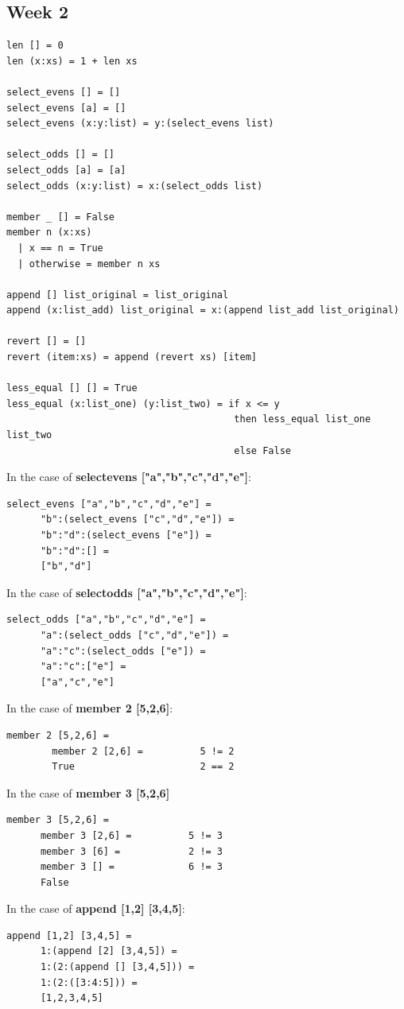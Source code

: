 \documentclass{article}
\theoremstyle{theorem}
\theoremstyle{definition}
\theoremstyle{remark}
\begin{document}
\subsection{Week 2}
\begin{lstlisting}
len [] = 0
len (x:xs) = 1 + len xs

select_evens [] = []
select_evens [a] = []
select_evens (x:y:list) = y:(select_evens list)

select_odds [] = []
select_odds [a] = [a]
select_odds (x:y:list) = x:(select_odds list)

member _ [] = False
member n (x:xs)
  | x == n = True
  | otherwise = member n xs

append [] list_original = list_original
append (x:list_add) list_original = x:(append list_add list_original)

revert [] = []
revert (item:xs) = append (revert xs) [item]

less_equal [] [] = True
less_equal (x:list_one) (y:list_two) = if x <= y
									    then less_equal list_one list_two
									    else False
\end{lstlisting}
In the case of \textbf{select\textunderscore evens ["a","b","c","d","e"]}:
\begin{lstlisting}
select_evens ["a","b","c","d","e"] =
      "b":(select_evens ["c","d","e"]) =
      "b":"d":(select_evens ["e"]) =
      "b":"d":[] =
      ["b","d"]
\end{lstlisting}
In the case of \textbf{select\textunderscore odds ["a","b","c","d","e"]}:
\begin{lstlisting}
select_odds ["a","b","c","d","e"] =
      "a":(select_odds ["c","d","e"]) =
      "a":"c":(select_odds ["e"]) =
      "a":"c":["e"] =
      ["a","c","e"]
\end{lstlisting}
In the case of \textbf{member 2 [5,2,6]}:
\begin{lstlisting}
member 2 [5,2,6] =
        member 2 [2,6] =          5 != 2
        True                      2 == 2
\end{lstlisting}
In the case of \textbf{member 3 [5,2,6]}
\begin{lstlisting}
member 3 [5,2,6] =
      member 3 [2,6] =          5 != 3
      member 3 [6] =            2 != 3
      member 3 [] =             6 != 3
      False
\end{lstlisting}
In the case of \textbf{append [1,2] [3,4,5]}:
\begin{lstlisting}
append [1,2] [3,4,5] =
      1:(append [2] [3,4,5]) =
      1:(2:(append [] [3,4,5])) =
      1:(2:([3:4:5])) =
      [1,2,3,4,5]
\end{lstlisting}
\end{document}

